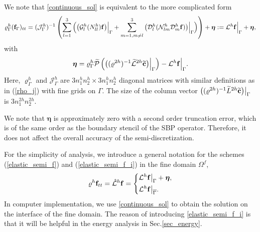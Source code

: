 We note that \eqref{continuous_sol} is equivalent to the more complicated form
\begin{equation}\label{elastic_semi_f_i}
{\varrho}^h_\Gamma ({\bf f}_\Gamma)_{tt} =
( {\mathcal{ J}}^{h}_\Gamma)^{-1}\left(\sum_{l=1}^3\Big(\big(\mathcal{G}_l^{h}({N}_{ll}^h){\bf f}\big)\Big|_\Gamma+\sum_{m=1,m\neq l}^3\big(\mathcal{D}_l^{h}(\mathcal{N}_{lm}^{h}\mathcal{D}_m^{h}{\bf f})\big)\Big|_\Gamma\Big) \right) + {\bm \eta} := \mathcal{L}^h{\bf f}\Big|_\Gamma + {\bm \eta},
\end{equation}
with 
\begin{equation}\label{eta}
{\bm \eta} = {\varrho}^h_{\Gamma}\wt{\mathcal{P}}\left(\big(({ \varrho}^{2h})^{-1}\wt{\mathcal{L}}^{2h} \wt{{\bf c}}\big)\Big|_{\Gamma}\right) - \mathcal{L}^{h}{\bf f}\Big|_{\Gamma}.
\end{equation}
Here, ${\varrho}^{h}_{\Gamma}$ and ${\mathcal{ J}}^{h}_{\Gamma}$ are $3n_1^hn_2^h\times 3n_1^hn_2^h$ diagonal matrices with similar definitions as in (\ref{rho_j}) with fine grids on $\Gamma$. The size of the column vector $\big(({\varrho}^{2h})^{-1}\widetilde{L}^{2h} \widetilde{{\bf c}}\big)\big|_{\Gamma}$ is $3n_1^{2h} n_2^{2h}$. 

 We note that $\bm \eta$ is approximately zero with a second order truncation error, which is of the same order as the boundary stencil of the SBP operator. Therefore, it does not affect the overall accuracy of the semi-discretization. 

For the simplicity of analysis, we introduce a general notation for the schemes (\ref{elastic_semi_f}) and (\ref{elastic_semi_f_i}) in the fine domain $\Omega^f$,
\begin{align}\label{fine_scheme}
{\varrho}^h{\bf f}_{tt} = \hat{\mathcal{L}}^h{\bf f} = \left\{
\begin{aligned}
&\mathcal{L}^h{\bf f}\big|_\Gamma +{\bm \eta}, \\
&\mathcal{L}^h{\bf f}\big|_{\overline{\Gamma}}.
\end{aligned}
\right.
\end{align}
In computer implementation, we use \eqref{continuous_sol} to obtain the solution on the interface of the fine domain. The reason of introducing    \eqref{elastic_semi_f_i} is that it will be helpful in the energy analysis in Sec.\ref{sec_energy}.

